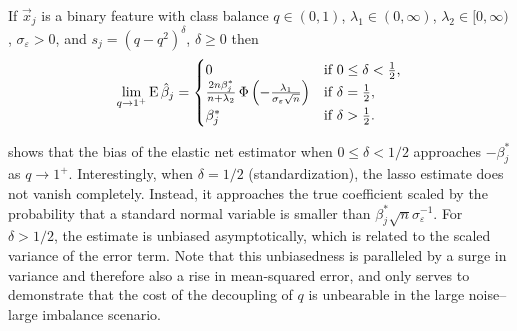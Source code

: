 \begin{theorem}
  \label{thm:classbalance-bias}
  If \(\vec{x}_j\) is a binary feature with class balance \(q \in (0, 1)\), \(\lambda_1 \in (0,\infty)\), \(\lambda_2 \in [0,\infty)\), \(\sigma_\varepsilon > 0\), and \(s_j = (q - q^2)^{\delta}\), \(\delta \geq 0\)  then
  \[
    \lim_{q \rightarrow 1^+} \operatorname{E} \hat{\beta}_j =
    \begin{cases}
      0                                                                                                  & \text{if } 0 \leq \delta < \frac{1}{2}, \\
      \frac{2n \beta_j^*}{n + \lambda_2} \operatorname{\Phi}\left(-\frac{\lambda_1}{\sigma_\varepsilon \sqrt{n}}\right) & \text{if } \delta = \frac{1}{2},        \\
      \beta^*_j                                                                                          & \text{if } \delta > \frac{1}{2}.
    \end{cases}
  \]
\end{theorem}

%
 shows that the bias of the elastic net estimator when \(0 \leq \delta < 1/2\) approaches
\(-\beta_j^*\) as \(q \rightarrow 1^+\). Interestingly, when \(\delta = 1/2\) (standardization), the lasso estimate does not vanish completely. Instead, it approaches the
true coefficient scaled by the probability that a standard normal variable is smaller than \(\beta_j^*\sqrt{n}\sigma_\varepsilon^{-1}\). For \(\delta > 1/2\), the
estimate is unbiased asymptotically, which is related to the scaled variance of the error term. Note that this unbiasedness is paralleled by a surge in variance and therefore also a rise in mean-squared error, and only serves to demonstrate that the cost of the decoupling of \(q\) is unbearable in the large noise--large imbalance scenario.

